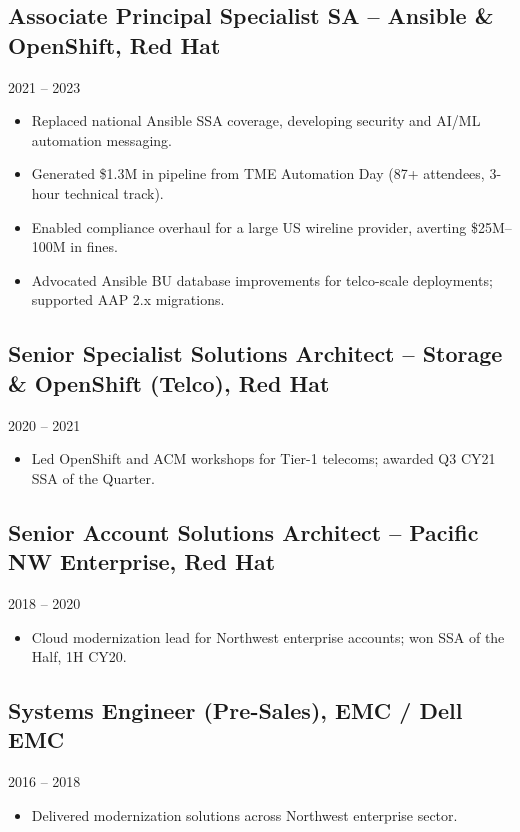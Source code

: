 \documentclass[11pt]{article}
\begin{document}
\subsection{Associate Principal Specialist SA – Ansible \& OpenShift, Red Hat}
\hfill 2021 – 2023
\begin{itemize}[leftmargin=*]
    \item Replaced national Ansible SSA coverage, developing security and AI/ML automation messaging.
    \item Generated \$1.3M in pipeline from TME Automation Day (87+ attendees, 3-hour technical track).
    \item Enabled compliance overhaul for a large US wireline provider, averting \$25M–100M in fines.
    \item Advocated Ansible BU database improvements for telco-scale deployments; supported AAP 2.x migrations.
\end{itemize}

\subsection{Senior Specialist Solutions Architect – Storage \& OpenShift (Telco), Red Hat}
\hfill 2020 – 2021
\begin{itemize}[leftmargin=*]
    \item Led OpenShift and ACM workshops for Tier-1 telecoms; awarded Q3 CY21 SSA of the Quarter.
\end{itemize}

\subsection{Senior Account Solutions Architect – Pacific NW Enterprise, Red Hat}
\hfill 2018 – 2020
\begin{itemize}[leftmargin=*]
    \item Cloud modernization lead for Northwest enterprise accounts; won SSA of the Half, 1H CY20.
\end{itemize}

\subsection{Systems Engineer (Pre-Sales), EMC / Dell EMC}
\hfill 2016 – 2018
\begin{itemize}[leftmargin=*]
    \item Delivered modernization solutions across Northwest enterprise sector.
\end{itemize}
\end{document}
